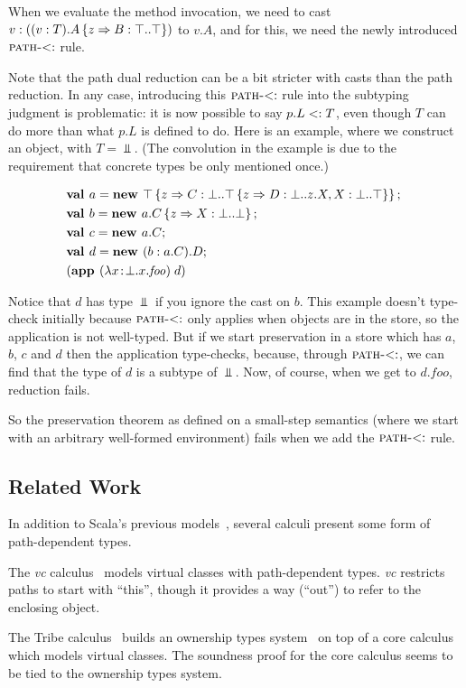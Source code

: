\documentclass[9pt]{sigplanconf}
\begin{document}
When we evaluate the method invocation, we need to cast $v : ((v : T).{A \left\{z \Rightarrow B : \top..\top \right\}})$ to $v.A$, and for
this, we need the newly introduced $\textsc{path-$<:$}$ rule.

Note that the path dual reduction can be a bit stricter with casts
than the path reduction. In any case, introducing this
$\textsc{path-$<:$}$ rule into the subtyping judgment is
problematic: it is now possible to say $p.L <: T$, even though $T$
can do more than what $p.L$ is defined to do. Here is an example,
where we construct an object, with $T = \Bot$. (The convolution in the
example is due to the requirement that concrete types be only
mentioned once.)

\begin{align*}
&\mlnew a {\Top \refine z {\Ldecl C \Bot {\Top \refine z {\Ldecl D \Bot {z.X}, \Ldecl X \Bot \Top}}}}{
\mlnew b {{a.C} \refine z {\Ldecl X \Bot \Bot}}}{
\mlnew c {a.C}}{
\mlnew d {(\wid b {a.C}).D}}{
\app {(\abs x \Bot {x.\mathit{foo}})} d
}
\end{align*}

Notice that $d$ has type $\Bot$ if you ignore the cast on $b$. This
example doesn't type-check initially because $\textsc{path-$<:$}$
only applies when objects are in the store, so the application is not
well-typed. But if we start preservation in a store which has $a$,
$b$, $c$ and $d$ then the application type-checks, because, through
$\textsc{path-$<:$}$, we can find that the type of $d$ is a subtype
of $\Bot$. Now, of course, when we get to $d.\mathit{foo}$, reduction
fails.

So the preservation theorem as defined on a small-step semantics
(where we start with an arbitrary well-formed environment) fails when
we add the $\textsc{path-$<:$}$ rule.

\subsection{Related Work}

In addition to Scala's previous models~\cite{nuObj,FS}, several
calculi present some form of path-dependent types.

The {\it vc} calculus~\cite{vc} models virtual classes with
path-dependent types. {\it vc} restricts paths to start with ``this'',
though it provides a way (``out'') to refer to the enclosing object.

The Tribe calculus~\cite{tribe} builds an ownership types
system~\cite{tribalo} on top of a core calculus which models virtual
classes. The soundness proof for the core calculus seems to be tied to
the ownership types system.
\end{document}
